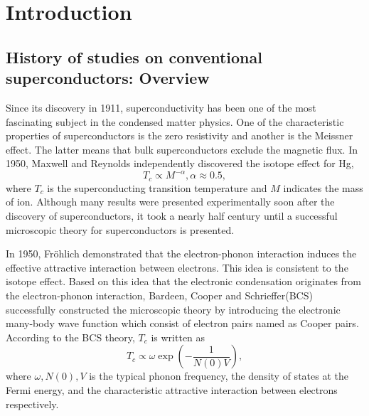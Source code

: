 

%
%
\chapter{Introduction}
\label{intro}



\section{History of studies on conventional superconductors: Overview}
Since its discovery in 1911\cite{Onnes1911}, superconductivity has been one of the most fascinating
subject in the condensed matter physics. One of the characteristic properties of superconductors is
the zero resistivity and another is the Meissner effect\cite{Meissner1933}.
The latter means that bulk superconductors exclude the magnetic flux.
In 1950, Maxwell\cite{Maxwell1950} and Reynolds\cite{Reynolds1950} independently discovered the 
isotope effect for Hg,
%
\begin{equation}
	T_{c} \propto M^{-\alpha}, \alpha \approx 0.5,
	\label{eq:isotope}
\end{equation}
%
where $T_c$ is the superconducting transition temperature and $M$ indicates the mass of ion.
Although many results were presented experimentally soon after the discovery of superconductors,
it took a nearly half century until a successful microscopic theory for superconductors is presented.

In 1950, Fr\"{o}hlich\cite{Froehlich1950} demonstrated that the electron-phonon interaction induces the
effective attractive interaction between electrons. This idea is consistent to the isotope effect.
Based on this idea that the electronic condensation originates from the electron-phonon interaction, 
Bardeen, Cooper and Schrieffer(BCS)\cite{BCS1957} successfully constructed the microscopic 
theory by introducing the electronic many-body wave function which consist of electron pairs named as
Cooper pairs\cite{Cooper1956}. According to the BCS theory, $T_c$ is written as
%
\begin{equation}
	T_{c} \propto \omega\exp \left( -\frac{1}{N(0)V} \right),
	\label{eq:TcBCS}
\end{equation}
%
where $\omega, N(0), V$ is the typical phonon frequency, the density of states at the Fermi energy, 
and the characteristic attractive interaction between electrons respectively.

